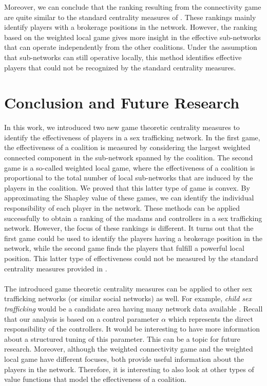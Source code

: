 \documentclass[10p]{article}
\theoremstyle{definition}
\theoremstyle{definition}
\begin{document}
Moreover, we can conclude that the ranking resulting from the connectivity game are quite similar to the standard centrality measures of \cite{mancuso2014not}. These rankings mainly identify players with a brokerage positions in the network. However, the ranking based on the weighted local game gives more insight in the effective sub-networks that can operate independently from the other coalitions. Under the assumption that sub-networks can still operative locally, this method identifies effective players that could not be recognized by the standard centrality measures. 

\section{Conclusion and Future Research}
In this work, we introduced two new game theoretic centrality measures to identify the effectiveness of players in a sex trafficking network. In the first game, the effectiveness of a coalition is measured by considering the largest weighted connected component in the sub-network spanned by the coalition. The second game is a so-called weighted local game, where the effectiveness of a coalition is proportional to the total number of local sub-networks that are induced by the players in the coalition. We proved that this latter type of game is convex. By approximating the Shapley value of these games, we can identify the individual responsibility of each player in the network. These methods can be applied successfully to obtain a ranking of the madams and controllers in a sex trafficking network. However, the focus of these rankings is different. It turns out that the first game could be used to identify the players having a brokerage position in the network, while the second game finds the players that fulfill a powerful local position. This latter type of effectiveness could not be measured by the standard centrality measures provided in \cite{mancuso2014not}.\\ \\
The introduced game theoretic centrality measures can be applied to other sex trafficking networks (or similar social networks) as well. For example, \textit{child sex trafficking} would be a candidate area having many network data available \cite{cockbain2018offender}. Recall that our analysis is based on a control parameter $\alpha$ which represents the direct responsibility of the controllers. It would be interesting to have more information about a structured tuning of this parameter. This can be a topic for future research. Moreover, although the weighted connectivity game and the weighted local game have different focuses, both provide useful information about the players in the network. Therefore, it is interesting to also look at other types of value functions that model the effectiveness of a coalition.
\end{document}
